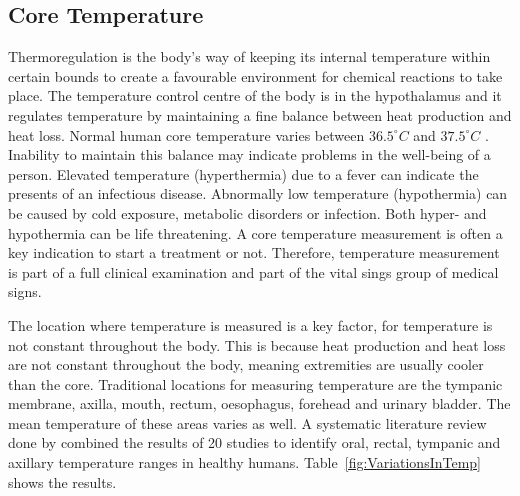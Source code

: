 \subsection{Core Temperature}
Thermoregulation is the body's way of keeping its internal temperature within certain bounds to create a favourable environment for chemical reactions to take place. The temperature control centre of the body is in the hypothalamus and it regulates temperature by maintaining a fine balance between heat production and heat loss. Normal human core temperature varies between $36.5^{\circ}C$ and $37.5^{\circ}C$ \citep{jones2010biomedical}. Inability to maintain this balance may indicate problems in the well-being of a person. Elevated temperature (hyperthermia) due to a fever can indicate the presents of an infectious disease. Abnormally low temperature (hypothermia) can be caused by cold exposure, metabolic disorders or infection. Both hyper- and hypothermia can be life threatening. A core temperature measurement is often a key indication to start a treatment or not. Therefore, temperature measurement is part of a full clinical examination and part of the vital sings group of medical signs.

\medskip
The location where temperature is measured is a key factor, for temperature is not constant throughout the body. This is because heat production and heat loss are not constant throughout the body, meaning extremities are usually cooler than the core. Traditional locations for measuring temperature are the tympanic membrane, axilla, mouth, rectum, oesophagus, forehead and urinary bladder. The mean temperature of these areas varies as well. A systematic literature review done by \cite{sund2002normal} combined the results of 20 studies to identify oral, rectal, tympanic and axillary temperature ranges in healthy humans. Table~\ref{fig:VariationsInTemp} shows the results.

